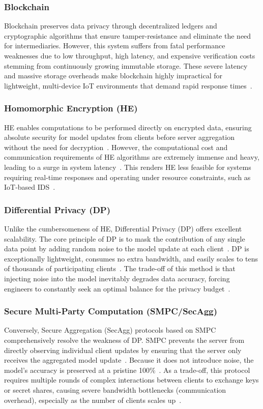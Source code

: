 \subsubsection*{Blockchain}
Blockchain preserves data privacy through decentralized ledgers and cryptographic algorithms that ensure tamper-resistance and eliminate the need for intermediaries. However, this system suffers from fatal performance weaknesses due to low throughput, high latency, and expensive verification costs stemming from continuously growing immutable storage. These severe latency and massive storage overheads make blockchain highly impractical for lightweight, multi-device IoT environments that demand rapid response times~\cite{vyas2024}.

\subsubsection*{Homomorphic Encryption (HE)}
HE enables computations to be performed directly on encrypted data, ensuring absolute security for model updates from clients before server aggregation without the need for decryption~\cite{nakayiza2026}. However, the computational cost and communication requirements of HE algorithms are extremely immense and heavy, leading to a surge in system latency~\cite{nakayiza2026}. This renders HE less feasible for systems requiring real-time responses and operating under resource constraints, such as IoT-based IDS~\cite{nakayiza2026}.

\subsubsection*{Differential Privacy (DP)}
Unlike the cumbersomeness of HE, Differential Privacy (DP) offers excellent scalability. The core principle of DP is to mask the contribution of any single data point by adding random noise to the model update at each client~\cite{pedro2022}. DP is exceptionally lightweight, consumes no extra bandwidth, and easily scales to tens of thousands of participating clients~\cite{pedro2022}. The trade-off of this method is that injecting noise into the model inevitably degrades data accuracy, forcing engineers to constantly seek an optimal balance for the privacy budget~\cite{pedro2022}.

\subsubsection*{Secure Multi-Party Computation (SMPC/SecAgg)}
Conversely, Secure Aggregation (SecAgg) protocols based on SMPC comprehensively resolve the weakness of DP. SMPC prevents the server from directly observing individual client updates by ensuring that the server only receives the aggregated model update~\cite{bessaa2026}. Because it does not introduce noise, the model's accuracy is preserved at a pristine 100\%~\cite{bessaa2026}. As a trade-off, this protocol requires multiple rounds of complex interactions between clients to exchange keys or secret shares, causing severe bandwidth bottlenecks (communication overhead), especially as the number of clients scales up~\cite{bessaa2026}.

